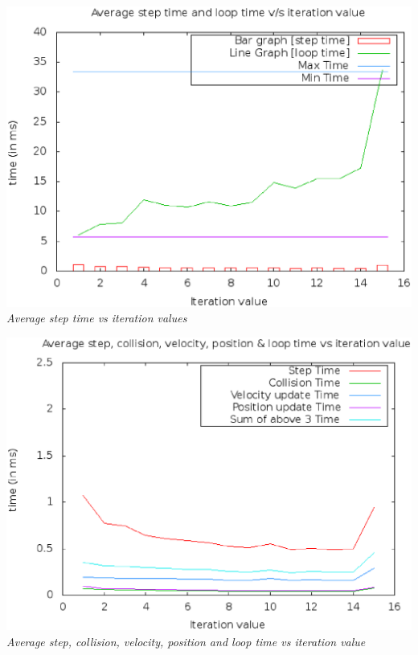 \documentclass[11pt]{article}
\begin{document}
\begin{center}
 \includegraphics[scale = 0.4]{images/plot1} \\
  \emph{Average step time vs iteration values} \\
\end{center}

\begin{center}
 \includegraphics[scale = 0.4]{images/plot2} \\
  \emph{Average step, collision, velocity, position and loop time vs iteration value} \\
\end{center}

\end{document}

